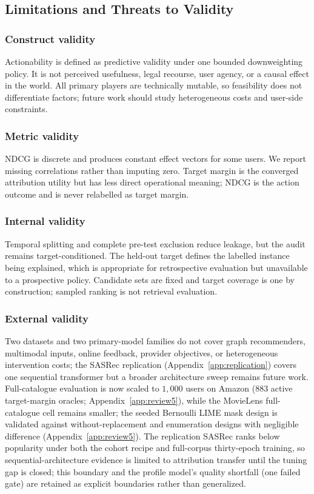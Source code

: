 \documentclass[pdflatex,sn-mathphys-num]{sn-jnl}
\theoremstyle{thmstyleone}
\theoremstyle{thmstyletwo}
\theoremstyle{thmstylethree}
\begin{document}
\subsection{Limitations and Threats to Validity}\label{sec:limitations}
\subsubsection{Construct validity}
Actionability is defined as predictive validity under one bounded downweighting policy. It is not perceived usefulness, legal recourse, user agency, or a causal effect in the world. All primary players are technically mutable, so feasibility does not differentiate factors; future work should study heterogeneous costs and user-side constraints.

\subsubsection{Metric validity}
NDCG is discrete and produces constant effect vectors for some users. We report missing correlations rather than imputing zero. Target margin is the converged attribution utility but has less direct operational meaning; NDCG is the action outcome and is never relabelled as target margin.

\subsubsection{Internal validity}
Temporal splitting and complete pre-test exclusion reduce leakage, but the audit remains target-conditioned. The held-out target defines the labelled instance being explained, which is appropriate for retrospective evaluation but unavailable to a prospective policy. Candidate sets are fixed and target coverage is one by construction; sampled ranking is not retrieval evaluation.

\subsubsection{External validity}
Two datasets and two primary-model families do not cover graph recommenders, multimodal inputs, online feedback, provider objectives, or heterogeneous intervention costs; the SASRec replication (Appendix~\ref{app:replication}) covers one sequential transformer but a broader architecture sweep remains future work. Full-catalogue evaluation is now scaled to $1{,}000$ users on Amazon ($883$ active target-margin oracles; Appendix~\ref{app:review5}), while the MovieLens full-catalogue cell remains smaller; the seeded Bernoulli LIME mask design is validated against without-replacement and enumeration designs with negligible difference (Appendix~\ref{app:review5}). The replication SASRec ranks below popularity under both the cohort recipe and full-corpus thirty-epoch training, so sequential-architecture evidence is limited to attribution transfer until the tuning gap is closed; this boundary and the profile model's quality shortfall (one failed gate) are retained as explicit boundaries rather than generalized.
\end{document}
